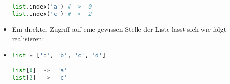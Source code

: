 \documentclass{article}
\begin{document}
\begin{itemize}
\begin{lstlisting}[language=Python]
list.index('a') # ->  0
list.index('c') # ->  2
		\end{lstlisting}
		\item[] Ein direkter Zugriff auf eine gewissen Stelle der Liste lässt sich wie folgt realisieren:
		\item[] \begin{lstlisting}[language=Python]
list = ['a', 'b', 'c', 'd']

list[0]	 ->  'a'
list[2]	 ->  'c'
		\end{lstlisting}
	\end{itemize}
\end{document}
